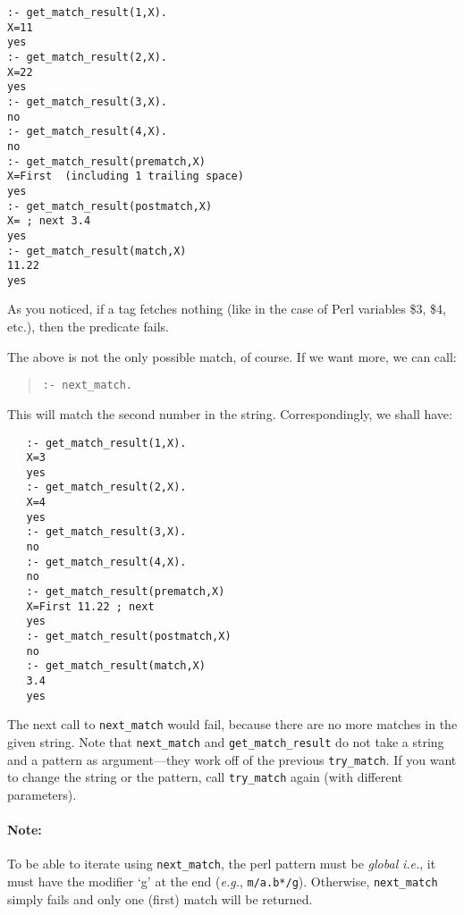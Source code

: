 \begin{verbatim}
:- get_match_result(1,X).
X=11
yes
:- get_match_result(2,X).
X=22
yes
:- get_match_result(3,X).
no
:- get_match_result(4,X).
no
:- get_match_result(prematch,X)
X=First  (including 1 trailing space)
yes
:- get_match_result(postmatch,X)
X= ; next 3.4
yes
:- get_match_result(match,X)
11.22
yes
\end{verbatim}

As you noticed, if a tag fetches nothing (like in the case of Perl
variables \$3, \$4, etc.), then the predicate fails.

The above is not the only possible match, of course. If we want more, we
can call:
\begin{quote}
 {\tt  :- next\_match. }
\end{quote}

This will match the second number in the string. Correspondingly, we shall
have: 
\begin{verbatim}
   :- get_match_result(1,X).
   X=3
   yes
   :- get_match_result(2,X).
   X=4
   yes
   :- get_match_result(3,X).
   no
   :- get_match_result(4,X).
   no
   :- get_match_result(prematch,X)
   X=First 11.22 ; next 
   yes
   :- get_match_result(postmatch,X)
   no
   :- get_match_result(match,X)
   3.4
   yes
\end{verbatim}

The next call to {\tt next\_match}  would fail, because there are no more
matches in the given string. Note that {\tt next\_match} and
{\tt get\_match\_result} do not take a string and a pattern as
argument---they work off of the previous {\tt try\_match}. If you want to
change the string or the pattern, call {\tt try\_match} again (with
different parameters).

\paragraph{Note:} To be able to iterate using {\tt next\_match}, the perl
pattern must be \emph{global} {\it i.e.}, it must have the modifier `g' at
the end ({\it e.g.}, {\tt m/a.b*/g}). Otherwise, {\tt next\_match} simply
fails and only one (first) match will be returned.  

